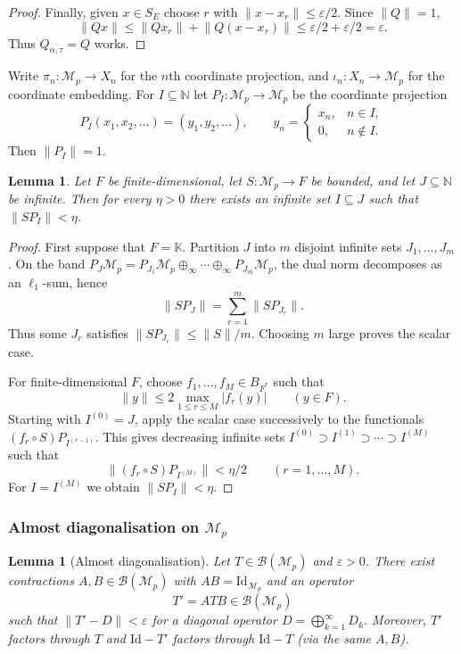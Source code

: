 \documentclass[11pt]{amsart}
\theoremstyle{plain}
\newtheorem{lemma}[theorem]{Lemma}
\theoremstyle{definition}
\numberwithin{equation}{section}
\newcommand{\norm}[1]{\lVert #1 \rVert}
\newcommand{\Bop}{\mathcal{B}}
\newcommand{\N}{\mathbb{N}}
\newcommand{\Id}{\mathrm{Id}}
\renewcommand{\le}{\leqslant}
\begin{document}
\begin{proof}
Finally, given $x\in S_E$ choose $r$ with $\norm{x-x_r}\le \varepsilon/2$.
Since $\norm{Q}=1$,
\[
\norm{Qx}\le \norm{Qx_r}+\norm{Q(x-x_r)}\le \varepsilon/2+\varepsilon/2=\varepsilon.
\]
Thus $Q_{\alpha,\tau}=Q$ works.
\end{proof}


Write $\pi_n\colon \mathcal{M}_p\to X_n$ for the $n$th coordinate projection, and $\iota_n\colon X_n\to\mathcal{M}_p$ for the coordinate embedding.
For $I\subseteq\N$ let $P_I\colon \mathcal{M}_p\to \mathcal{M}_p$ be the coordinate projection
\[
P_I(x_1,x_2,\dots)=(y_1,y_2,\dots),\qquad y_n=\begin{cases}x_n,&n\in I,\\ 0,&n\notin I.\end{cases}
\]
Then $\norm{P_I}=1$.

\begin{lemma}\label{lem:tail-small}
Let $F$ be finite-dimensional, let $S\colon\mathcal M_p\to F$ be bounded, and let $J\subseteq\N$ be infinite.  Then for every $\eta>0$ there exists an infinite set $I\subseteq J$ such that $\|SP_I\|<\eta$.
\end{lemma}

\begin{proof}
    First suppose that $F=\mathbb K$.  Partition $J$ into $m$ disjoint infinite sets $J_1,\ldots,J_m$.  On the band $P_J\mathcal M_p=P_{J_1}\mathcal M_p\oplus_\infty\cdots\oplus_\infty P_{J_m}\mathcal M_p$, the dual norm decomposes as an $\ell_1$-sum, hence
    \[
        \|SP_J\|=\sum_{r=1}^m\|SP_{J_r}\|.
    \]
    Thus some $J_r$ satisfies $\|SP_{J_r}\|\le \|S\|/m$.  Choosing $m$ large proves the scalar case.
    
    For finite-dimensional $F$, choose $f_1,\ldots,f_M\in B_{F^*}$ such that
    \[
        \|y\|\le 2\max_{1\le r\le M}|f_r(y)|\qquad(y\in F).
    \]
    Starting with $I^{(0)}=J$, apply the scalar case successively to the functionals
    $(f_r\circ S)P_{I^{(r-1)}}$.  This gives decreasing infinite sets
    $I^{(0)}\supset I^{(1)}\supset\cdots\supset I^{(M)}$ such that
    \[
        \|(f_r\circ S)P_{I^{(M)}}\|<\eta/2
        \qquad(r=1,\ldots,M).
    \]
    For $I=I^{(M)}$ we obtain $\|SP_I\|<\eta$.
\end{proof}

\subsubsection{Almost diagonalisation on $\mathcal{M}_p$}

\begin{lemma}[Almost diagonalisation]\label{lem:almost-diagonal}
Let $T\in\Bop(\mathcal{M}_p)$ and $\varepsilon>0$.
There exist contractions $A,B\in\Bop(\mathcal{M}_p)$ with $AB=\Id_{\mathcal{M}_p}$ and an operator
\[
T' = A T B \in\Bop(\mathcal{M}_p)
\]
such that $\norm{T'-D}<\varepsilon$ for a diagonal operator $D=\bigoplus_{k=1}^\infty D_k$.
Moreover, $T'$ factors through $T$ and $\Id-T'$ factors through $\Id-T$ (via the same $A,B$).
\end{lemma}
\end{document}

